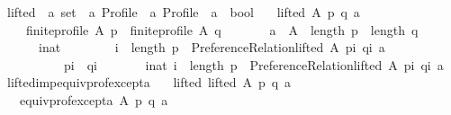 \begin{isabellebody}
\isanewline
\isanewline
{}\isamarkupfalse%
\ lifted\ {\isacharcolon}{\kern0pt}{\isacharcolon}{\kern0pt}\ {\isachardoublequoteopen}{\isacharprime}{\kern0pt}a\ set\ {\isasymRightarrow}\ {\isacharprime}{\kern0pt}a\ Profile\ {\isasymRightarrow}\ {\isacharprime}{\kern0pt}a\ Profile\ {\isasymRightarrow}\ {\isacharprime}{\kern0pt}a\ {\isasymRightarrow}\ bool{\isachardoublequoteclose}\ \isanewline
\ \ {\isachardoublequoteopen}lifted\ A\ p\ q\ a\ {\isasymequiv}\isanewline
\ \ \ \ finite{\isacharunderscore}{\kern0pt}profile\ A\ p\ {\isasymand}\ finite{\isacharunderscore}{\kern0pt}profile\ A\ q\ {\isasymand}\isanewline
\ \ \ \ \ \ a\ {\isasymin}\ A\ {\isasymand}\ length\ p\ {\isacharequal}{\kern0pt}\ length\ q\ {\isasymand}\isanewline
\ \ \ \ \ \ {\isacharparenleft}{\kern0pt}{\isasymforall}i{\isacharcolon}{\kern0pt}{\isacharcolon}{\kern0pt}nat{\isachardot}{\kern0pt}\isanewline
\ \ \ \ \ \ \ \ {\isacharparenleft}{\kern0pt}i\ {\isacharless}{\kern0pt}\ length\ p\ {\isasymand}\ {\isasymnot}Preference{\isacharunderscore}{\kern0pt}Relation{\isachardot}{\kern0pt}lifted\ A\ {\isacharparenleft}{\kern0pt}p{\isacharbang}{\kern0pt}i{\isacharparenright}{\kern0pt}\ {\isacharparenleft}{\kern0pt}q{\isacharbang}{\kern0pt}i{\isacharparenright}{\kern0pt}\ a{\isacharparenright}{\kern0pt}\ {\isasymlongrightarrow}\isanewline
\ \ \ \ \ \ \ \ \ \ {\isacharparenleft}{\kern0pt}p{\isacharbang}{\kern0pt}i{\isacharparenright}{\kern0pt}\ {\isacharequal}{\kern0pt}\ {\isacharparenleft}{\kern0pt}q{\isacharbang}{\kern0pt}i{\isacharparenright}{\kern0pt}{\isacharparenright}{\kern0pt}\ {\isasymand}\isanewline
\ \ \ \ \ \ {\isacharparenleft}{\kern0pt}{\isasymexists}i{\isacharcolon}{\kern0pt}{\isacharcolon}{\kern0pt}nat{\isachardot}{\kern0pt}\ i\ {\isacharless}{\kern0pt}\ length\ p\ {\isasymand}\ Preference{\isacharunderscore}{\kern0pt}Relation{\isachardot}{\kern0pt}lifted\ A\ {\isacharparenleft}{\kern0pt}p{\isacharbang}{\kern0pt}i{\isacharparenright}{\kern0pt}\ {\isacharparenleft}{\kern0pt}q{\isacharbang}{\kern0pt}i{\isacharparenright}{\kern0pt}\ a{\isacharparenright}{\kern0pt}{\isachardoublequoteclose}\isanewline
\isanewline
{}\isamarkupfalse%
\ lifted{\isacharunderscore}{\kern0pt}imp{\isacharunderscore}{\kern0pt}equiv{\isacharunderscore}{\kern0pt}prof{\isacharunderscore}{\kern0pt}except{\isacharunderscore}{\kern0pt}a{\isacharcolon}{\kern0pt}\isanewline
\ \ \ lifted{\isacharcolon}{\kern0pt}\ {\isachardoublequoteopen}lifted\ A\ p\ q\ a{\isachardoublequoteclose}\isanewline
\ \ \ {\isachardoublequoteopen}equiv{\isacharunderscore}{\kern0pt}prof{\isacharunderscore}{\kern0pt}except{\isacharunderscore}{\kern0pt}a\ A\ p\ q\ a{\isachardoublequoteclose}\isanewline

\end{isabellebody}
